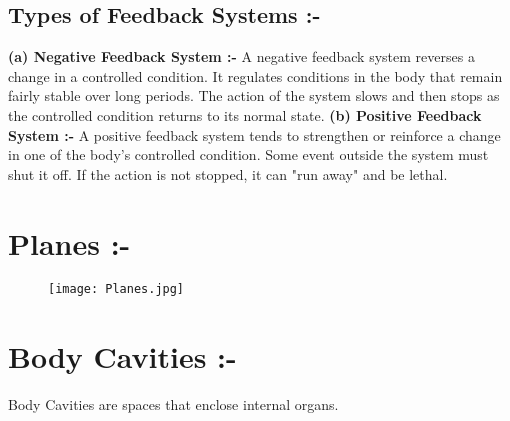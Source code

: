 \documentclass[12pt]{article}
\begin{document}
\begin{small}
\subsection{Types of Feedback Systems :- }
\textbf{(a) Negative Feedback System :-} A negative feedback system reverses a change in a controlled condition. It regulates conditions in the body that remain fairly stable over long periods. The action of the system slows and then stops as the controlled condition returns to its normal state.
\linebreak
\textbf{(b) Positive Feedback System :-} A positive feedback system tends to strengthen or reinforce a change in one of the body's controlled condition. Some event outside the system must shut it off. If the action is not stopped, it can "run away" and be lethal.
\section{Planes :-}
\begin{figure}[h]
\centering
\texttt{[image: Planes.jpg]}
\end{figure}
\section{Body Cavities :-}
Body Cavities are spaces that enclose internal organs.
\linebreak



\end{small}
\end{document}
